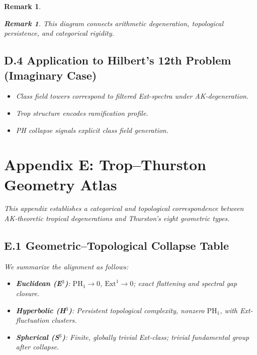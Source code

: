 \documentclass[11pt]{article}
\newtheorem{remark}[theorem]{Remark}
\begin{document}
\begin{remark}
\begin{remark}
This diagram connects arithmetic degeneration, topological persistence, and categorical rigidity.
\end{remark}

\subsection*{D.4 Application to Hilbert’s 12th Problem (Imaginary Case)}

\begin{itemize}
  \item Class field towers correspond to filtered Ext-spectra under AK-degeneration.
  \item Trop structure encodes ramification profile.
  \item PH collapse signals explicit class field generation.
\end{itemize}



\section*{Appendix E: Trop–Thurston Geometry Atlas}

This appendix establishes a categorical and topological correspondence  
between AK-theoretic tropical degenerations and Thurston's eight geometric types.

\subsection*{E.1 Geometric–Topological Collapse Table}

We summarize the alignment as follows:

\begin{itemize}
  \item \textbf{Euclidean (E$^3$)}:  
  $\mathrm{PH}_1 \to 0$, $\mathrm{Ext}^1 \to 0$; exact flattening and spectral gap closure.

  \item \textbf{Hyperbolic (H$^3$)}:  
  Persistent topological complexity, nonzero $\mathrm{PH}_1$, with Ext-fluctuation clusters.

  \item \textbf{Spherical (S$^3$)}:  
  Finite, globally trivial Ext-class; trivial fundamental group after collapse.


\end{itemize}
\end{remark}
\end{document}
